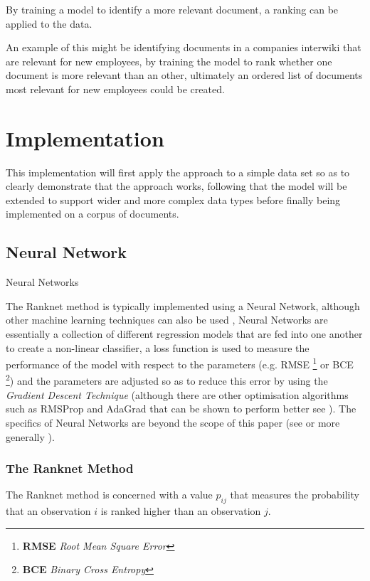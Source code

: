 \documentclass[a4paper,11pt,twoside]{article}
\begin{document}
By training a model to identify a more relevant document, a ranking
can be applied to the data.

An example of this might be identifying documents in a companies
interwiki that are relevant for new employees, by training the model
to rank whether one document is more relevant than an other,
ultimately an ordered list of documents most relevant for new
employees could be created.
\section{Implementation}
\label{sec:org6bffde5}
This implementation will first apply the approach to a simple data
set so as to clearly demonstrate that the approach works, following
that the model will be extended to support wider and more complex
data types before finally being implemented on a corpus of documents.

\subsection{Neural Network}
\label{sec:org89df9e1}
Neural Networks \cite{pictonNeuralNetworks1994}

The Ranknet method is typically implemented using a Neural Network,
although other machine learning techniques can also be used
\cite[]{christopherburgesRankNetRankingRetrospective2015},
Neural Networks are essentially a collection of different
regression models that are fed into one another to create a
non-linear classifier, a loss function is used to measure the
performance of the model with respect to the parameters
(e.g. RMSE \footnote{\textbf{RMSE} \emph{Root Mean Square Error}} or BCE \footnote{\textbf{BCE} \emph{Binary Cross Entropy}}) and the parameters are adjusted so
as to reduce this error by using the \emph{Gradient Descent Technique}
(although there are other optimisation algorithms such as RMSProp
and AdaGrad \cite{mukkamalaVariantsRMSPropAdagrad2017} that can be
shown to perform better see
\cite{bushaevUnderstandingRMSpropFaster2018}). The specifics of
Neural Networks are beyond the scope of this paper (see
\cite{hmkcodeBackpropagationStepStep} or more generally \cite{pictonNeuralNetworks1994}).

\subsubsection{The Ranknet Method}
\label{sec:org4a2ceb0}

The Ranknet method is concerned with a value \(p_{ij}\) that
measures the probability that an observation \(i\) is ranked higher
than an observation \(j\).
\end{document}
